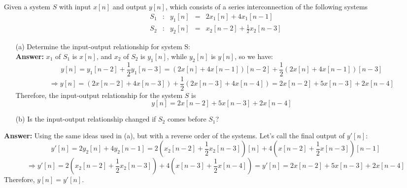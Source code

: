 \documentclass{article}
\begin{document}
\subsection{} Given a system $S$ with input $x[n]$ and output $y[n]$, which consists of a series interconnection of the following systems\\
\begin{equation*}
\begin{array}{lllll} S_{1} &:& y_{1}[n] &=& 2x_{1}[n]+4x_{1}[n-1]\\ S_{2} &:& y_{2}[n] &=& x_{2}[n-2]+\frac{1}{2}x_{2}[n-3]\end{array}
\end{equation*}
\begin{enumerate}
\item[(a)] Determine the input-output relationship for system S: \\
\textbf{Answer:} $x_{1}$ of $S_{1}$ is $x[n]$, and $x_{2}$ of $S_{2}$ is $y_{1}[n]$, while $y_{2}[n]$ is $y[n]$, so we have: \\
\begin{equation*}
y[n] = y_{1}[n-2]+\frac{1}{2}y_{1}[n-3] = (2x[n]+4x[n-1])[n-2]+\frac{1}{2}(2x[n]+4x[n-1])[n-3]
\end{equation*}
\begin{equation*}
\Rightarrow y[n] = (2x[n-2]+4x[n-3])+\frac{1}{2}(2x[n-3]+4x[n-4]) = 2x[n-2]+5x[n-3]+2x[n-4]
\end{equation*}
Therefore, the input-output relationship for the system $S$ is
\begin{equation*}
y[n] = 2x[n-2]+5x[n-3]+2x[n-4]
\end{equation*}
\item[(b)] Is the input-output relationship changed if $S_{2}$ comes before $S_{1}$?
\end{enumerate}
\textbf{Answer:} Using the same ideas used in (a), but with a reverse order of the systems. Let's call the final output of $y'[n]$:
\begin{equation*}
y'[n] = 2y_{2}[n]+4y_{2}[n-1] = 2(x_{2}[n-2]+\frac{1}{2}x_{2}[n-3])[n]+4(x[n-2]+\frac{1}{2}x[n-3])[n-1]
\end{equation*}
\begin{equation*}
\Rightarrow y'[n] = 2(x_{2}[n-2]+\frac{1}{2}x_{2}[n-3])+4(x[n-3]+\frac{1}{2}x[n-4]) = y'[n] = 2x[n-2]+5x[n-3]+2x[n-4]
\end{equation*}
Therefore, $y[n]=y'[n]$.
\setcounter{subsection}{24}
\end{document}
